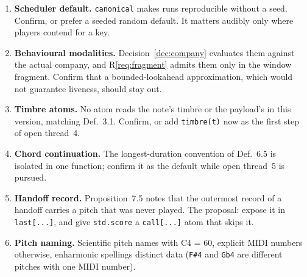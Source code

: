 \documentclass[11pt,a4paper]{article}
\theoremstyle{definition}
\theoremstyle{remark}
\begin{document}
\begin{enumerate}[leftmargin=*,itemsep=3pt]
  receipt's timbre, or its location when the timbre is open, with optional
  labels. Confirm, and confirm that a chimera's contention set should draw from
  one stream rather than, say, the stream of the player whose touch it is.
\item \textbf{Scheduler default.} \texttt{canonical} makes runs reproducible
  without a seed. Confirm, or prefer a seeded random default. It matters
  audibly only where players contend for a key.
\item \textbf{Behavioural modalities.} Decision~\ref{dec:company} evaluates them
  against the actual company, and R\ref{req:fragment} admits them only in the
  window fragment. Confirm that a bounded-lookahead approximation, which would
  not guarantee liveness, should stay out.
\item \textbf{Timbre atoms.} No atom reads the note's timbre or the payload's in
  this version, matching Def.~3.1. Confirm, or add \texttt{timbre(t)} now as the
  first step of open thread~4.
\item \textbf{Chord continuation.} The longest-duration convention of Def.~6.5
  is isolated in one function; confirm it as the default while open thread~5 is
  pursued.
\item \textbf{Handoff record.} Proposition~7.5 notes that the outermost record
  of a handoff carries a pitch that was never played. The proposal: expose it in
  \texttt{last[...]}, and give \texttt{std.score} a \texttt{call[...]} atom that
  skips it.
\item \textbf{Pitch naming.} Scientific pitch names with C4 = 60, explicit MIDI
  numbers otherwise, enharmonic spellings distinct data (\texttt{F\#4} and
  \texttt{Gb4} are different pitches with one MIDI number).
\end{enumerate}
\end{document}
